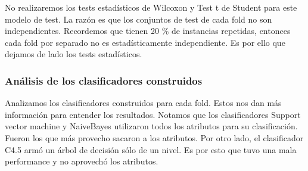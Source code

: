 No realizaremos los tests estadísticos de Wilcoxon y Test t de Student para este modelo de test. La razón es que los conjuntos de test de cada fold no son independientes. Recordemos que tienen 20 \% de instancias repetidas, entonces cada fold por separado no es estadísticamente independiente. Es por ello que dejamos de lado los tests estadísticos.

%
%
%

\subsubsection{Análisis de los clasificadores construidos}

Analizamos los clasificadores construidos para cada fold. Estos nos dan más información para entender los resultados. Notamos que los clasificadores Support vector machine y NaiveBayes utilizaron todos los atributos para su clasificación. Fueron los que más provecho sacaron a los atributos. Por otro lado, el clasificador C4.5 armó un árbol de decisión sólo de un nivel. Es por esto que tuvo una mala performance y no aprovechó los atributos.

